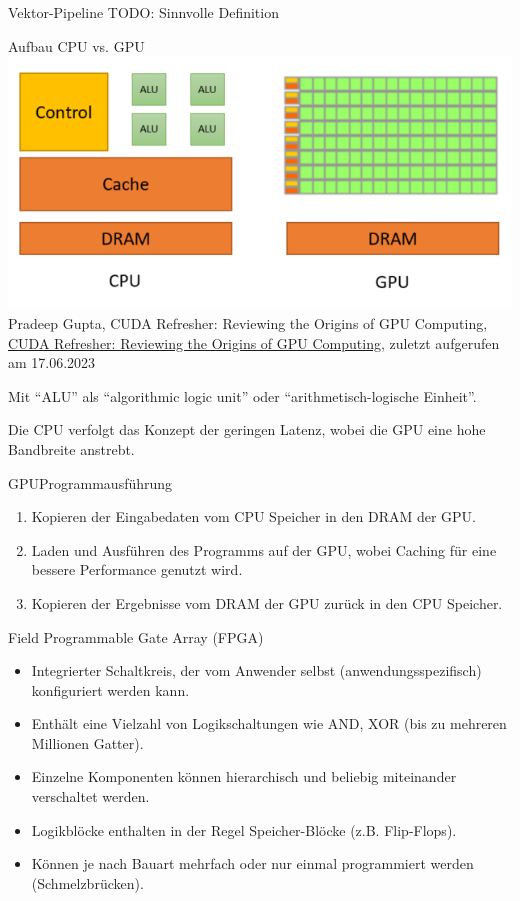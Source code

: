 \begin{defi}{Vektor-Pipeline}
    TODO: Sinnvolle Definition
\end{defi}

\begin{defi}{Aufbau CPU vs. GPU}
    \includegraphics[width=\textwidth]{images/CPUvsGPU.png}
    Pradeep Gupta, CUDA Refresher: Reviewing the Origins of GPU Computing,
    \url{CUDA Refresher: Reviewing the Origins of GPU Computing},
    zuletzt aufgerufen am 17.06.2023

    Mit \enquote{ALU} als \enquote{algorithmic logic unit} oder \enquote{arithmetisch-logische Einheit}.

    Die CPU verfolgt das Konzept der geringen Latenz,
    wobei die GPU eine hohe Bandbreite anstrebt.
\end{defi}

\begin{defi}{GPU}{Programmausführung}
    \begin{enumerate}
        \item Kopieren der Eingabedaten vom CPU Speicher in den DRAM der GPU.
        \item Laden und Ausführen des Programms auf der GPU,
              wobei Caching für eine bessere Performance genutzt wird.
        \item Kopieren der Ergebnisse vom DRAM der GPU zurück in den CPU Speicher.
    \end{enumerate}
\end{defi}

\begin{defi}{Field Programmable Gate Array (FPGA)}
    \begin{itemize}
        \item Integrierter Schaltkreis, der vom Anwender selbst (anwendungsspezifisch) konfiguriert werden kann.
        \item Enthält eine Vielzahl von Logikschaltungen wie AND, XOR (bis zu mehreren Millionen Gatter).
        \item Einzelne Komponenten können hierarchisch und beliebig miteinander verschaltet werden.
        \item Logikblöcke enthalten in der Regel Speicher-Blöcke (z.B. Flip-Flops).
        \item Können je nach Bauart mehrfach oder nur einmal programmiert werden (Schmelzbrücken).
    \end{itemize}
\end{defi}

